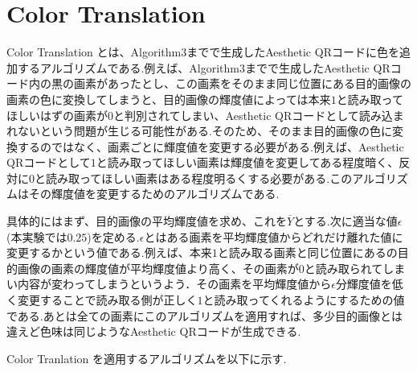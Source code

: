 \documentclass{thesis}
\begin{document}
\newpage
\section{Color Translation}

Color Translation とは、Algorithm$3$までで生成したAesthetic QRコードに色を追加するアルゴリズムである.例えば、Algorithm$3$までで生成したAesthetic QRコード内の黒の画素があったとし、この画素をそのまま同じ位置にある目的画像の画素の色に変換してしまうと、目的画像の輝度値によっては本来$1$と読み取ってほしいはずの画素が$0$と判別されてしまい、Aesthetic QRコードとして読み込まれないという問題が生じる可能性がある.そのため、そのまま目的画像の色に変換するのではなく、画素ごとに輝度値を変更する必要がある.例えば、Aesthetic QRコードとして$1$と読み取ってほしい画素は輝度値を変更してある程度暗く、反対に$0$と読み取ってほしい画素はある程度明るくする必要がある.このアルゴリズムはその輝度値を変更するためのアルゴリズムである.

具体的にはまず、目的画像の平均輝度値を求め、これを$\overline{Y}$とする.次に適当な値$\epsilon$(本実験では$0.25$)を定める.$\epsilon$とはある画素を平均輝度値からどれだけ離れた値に変更するかという値である.例えば、本来$1$と読み取る画素と同じ位置にあるの目的画像の画素の輝度値が平均輝度値より高く、その画素が$0$と読み取られてしまい内容が変わってしまうというよう．その画素を平均輝度値から$\epsilon$分輝度値を低く変更することで読み取る側が正しく$1$と読み取ってくれるようにするための値である.あとは全ての画素にこのアルゴリズムを適用すれば、多少目的画像とは違えど色味は同じようなAesthetic QRコードが生成できる.


Color Tranlation を適用するアルゴリズムを以下に示す.
\end{document}
